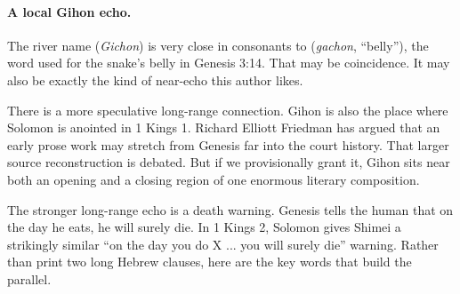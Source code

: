 \paragraph{A local Gihon echo.}
The river name  (\textit{Gichon}) is very close in consonants to  (\textit{gachon}, ``belly''), the word used for the snake's belly in Genesis 3:14. That may be coincidence. It may also be exactly the kind of near-echo this author likes.

There is a more speculative long-range connection. Gihon is also the place where Solomon is anointed in 1 Kings 1. Richard Elliott Friedman has argued that an early prose work may stretch from Genesis far into the court history.\cite{Friedman1998} That larger source reconstruction is debated. But if we provisionally grant it, Gihon sits near both an opening and a closing region of one enormous literary composition.

The stronger long-range echo is a death warning. Genesis tells the human that on the day he eats, he will surely die. In 1 Kings 2, Solomon gives Shimei a strikingly similar ``on the day you do X ... you will surely die'' warning. Rather than print two long Hebrew clauses, here are the key words that build the parallel.


